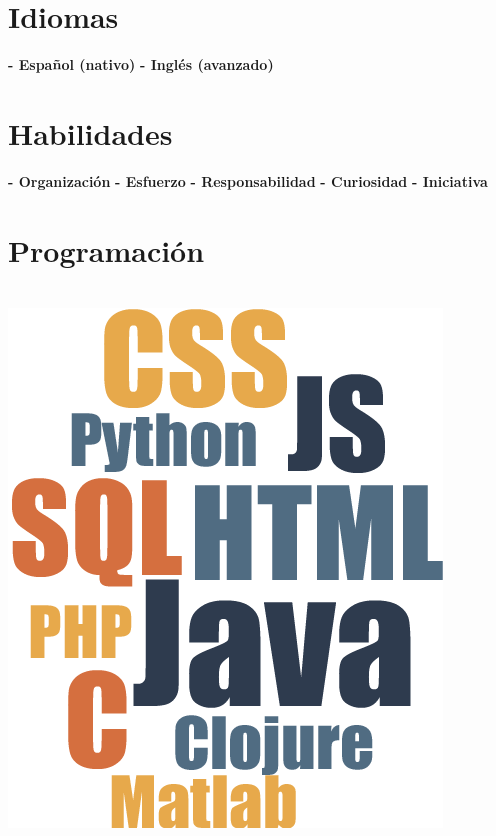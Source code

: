 \documentclass[]{friggeri-cv}
\begin{document}
\begin{aside}
  \section{Idiomas}
    \textbf{- Español (nativo)}
    \textbf{- Inglés (avanzado)}
    ~       
  \section{Habilidades}
    \textbf{- Organización}
    \textbf{- Esfuerzo}
    \textbf{- Responsabilidad}
    \textbf{- Curiosidad}
    \textbf{- Iniciativa}
    ~ 
  \section{Programación}
  \\ [0.5cm]
    \includegraphics[scale=0.9]{img/cloud.png}
    ~    
\end{aside}
~
\\ [0.8cm]
\end{document}
